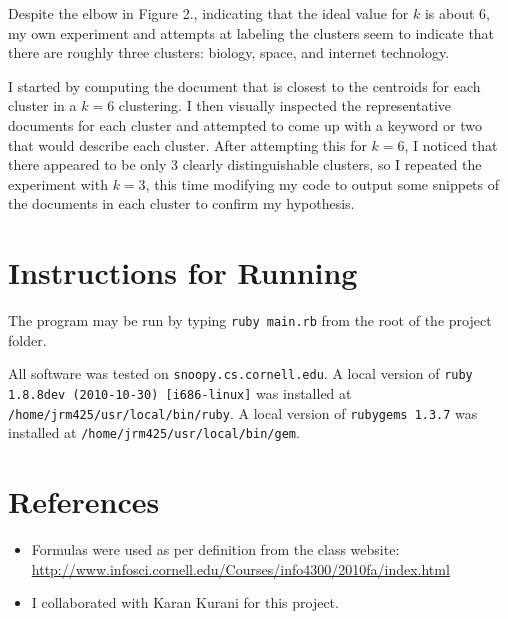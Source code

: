 \documentclass[12pt]{article}
\begin{document}
Despite the elbow in Figure 2., indicating that the ideal value for $k$ is about 6, my own experiment and attempts at labeling the clusters seem to indicate that there are roughly three clusters: biology, space, and internet technology.

I started by computing the document that is closest to the centroids for each cluster in a $k = 6$ clustering. I then visually inspected the representative documents for each cluster and attempted to come up with a keyword or two that would describe each cluster. After attempting this for $k = 6$, I noticed that there appeared to be only 3 clearly distinguishable clusters, so I repeated the experiment with $k = 3$, this time modifying my code to output some snippets of the documents in each cluster to confirm my hypothesis.

\newpage
\section{Instructions for Running} %
\label{sec:instructions_for_running}
The program may be run by typing \texttt{ruby main.rb} from the root of the project folder. 

All software was tested on \texttt{snoopy.cs.cornell.edu}. A local version of \texttt{ruby 1.8.8dev (2010-10-30) [i686-linux]} was installed at \newline
\texttt{/home/jrm425/usr/local/bin/ruby}. A local version of \texttt{rubygems 1.3.7} was installed at \texttt{/home/jrm425/usr/local/bin/gem}.

\section{References} %
\label{sec:references}
\begin{itemize}
  \item Formulas were used as per definition from the class website: \url{http://www.infosci.cornell.edu/Courses/info4300/2010fa/index.html}
  \item I collaborated with Karan Kurani for this project.
\end{itemize}
\end{document}

